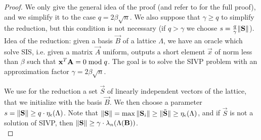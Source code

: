 \begin{proof}
We only give the general idea of the proof (and refer to \cite{GPV08} for the full proof), and we simplify it to the case $q = 2 \beta \sqrt{n}$. We also suppose that $\gamma \geq q$ to simplify the reduction, but this condition is not necessary (if $q > \gamma$ we choose $s = \frac{q}{\gamma} \Vert \mathbf{S} \Vert$).\\


Idea of the reduction: given a basis $\vec{B}$ of a lattice $\Lambda$, we have an oracle which solve SIS, i.e. given a matrix $\vec{A}$ uniform, outputs a short element $\vec{x}$ of norm less than $\beta$ such that  ${\bf x}^T {\bf A} = 0 \bmod q$. The goal is to solve the SIVP problem with an approximation factor $\gamma = 2 \beta \sqrt{n}$.

We use for the reduction a set $\vec{S}$  of linearly independent vectors of the lattice, that we initialize with the basis $\vec{B}$. We then choose a parameter $s =  \Vert \mathbf{S} \Vert \geq q \cdot  \eta_{\epsilon}(\Lambda)$. 
Note that $\Vert \mathbf{S} \Vert= \max \Vert \mathbf{S}_i \Vert \geq \Vert \tilde{\mathbf{S}} \Vert \geq \eta_{\epsilon}(\Lambda)$, and if $\vec{S}$ is not a solution of SIVP, then $\Vert \mathbf{S} \Vert \geq \gamma \cdot \lambda_n(\Lambda(\mathbf{B}))$.\\


\end{proof}
